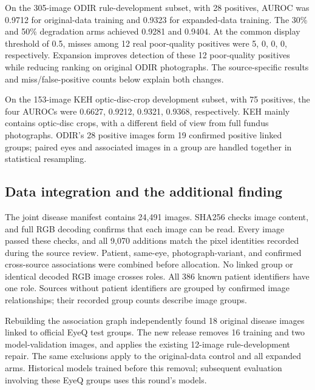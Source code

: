 \documentclass[
  10pt,
]{article}
\begin{document}
On the 305-image ODIR rule-development subset, with 28 positives, AUROC
was 0.9712 for original-data training and 0.9323 for expanded-data
training. The 30\% and 50\% degradation arms achieved 0.9281 and 0.9404.
At the common display threshold of 0.5, misses among 12 real
poor-quality positives were 5, 0, 0, 0, respectively. Expansion improves
detection of these 12 poor-quality positives while reducing ranking on
original ODIR photographs. The source-specific results and
miss/false-positive counts below explain both changes.

On the 153-image KEH optic-disc-crop development subset, with 75
positives, the four AUROCs were 0.6627, 0.9212, 0.9321, 0.9368,
respectively. KEH mainly contains optic-disc crops, with a different
field of view from full fundus photographs. ODIR's 28 positive images
form 19 confirmed positive linked groups; paired eyes and associated
images in a group are handled together in statistical resampling.

\subsection{Data integration and the additional
finding}\label{data-integration-and-the-additional-finding}

The joint disease manifest contains 24,491 images. SHA256 checks image
content, and full RGB decoding confirms that each image can be read.
Every image passed these checks, and all 9,070 additions match the pixel
identities recorded during the source review. Patient, same-eye,
photograph-variant, and confirmed cross-source associations were
combined before allocation. No linked group or identical decoded RGB
image crosses roles. All 386 known patient identifiers have one role.
Sources without patient identifiers are grouped by confirmed image
relationships; their recorded group counts describe image groups.

Rebuilding the association graph independently found 18 original disease
images linked to official EyeQ test groups. The new release removes 16
training and two model-validation images, and applies the existing
12-image rule-development repair. The same exclusions apply to the
original-data control and all expanded arms. Historical models trained
before this removal; subsequent evaluation involving these EyeQ groups
uses this round's models.
\end{document}
